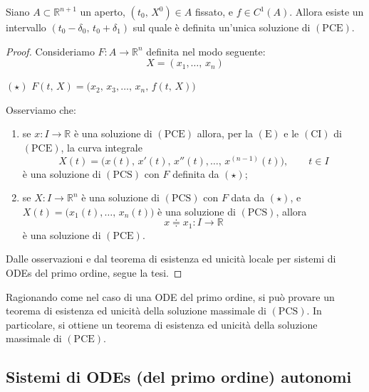 \begin{cor}
Siano $A \subset \mathbb{R}^{n+1}$ un aperto, $(t_0,\,X^0) \in A$ fissato, e $f \in C^1(A)$. Allora esiste un intervallo $(t_0-\delta_0,\,t_0+\delta_1)$ sul quale è definita un'unica soluzione di $\mathrm{(PCE)}$.
\end{cor}
\begin{proof}
Consideriamo $F : A \longrightarrow \mathbb{R}^n$ definita nel modo seguente:
$$
X = (x_1,\ldots,\,x_n)
$$
\begin{center}
$\mathrm{(\star)}$
\hfill
$\displaystyle
F(t,\,X) = \Big( x_2,\,x_3,\ldots,\,x_n,\,f(t,\,X) \Big)
$
\hfill \null \\
\end{center}
Osserviamo che:
\begin{enumerate}[labelindent=\parindent,leftmargin=*,label=\textnormal{(\roman*)},start=1]
\item se $x : I \longrightarrow \mathbb{R}$ è una soluzione di $\mathrm{(PCE)}$ allora, per la $\mathrm{(E)}$ e le $\mathrm{(CI)}$ di $\mathrm{(PCE)}$, la curva integrale
$$
X(t) = \Big( x(t),\,x'(t),\,x''(t),\ldots,\,x^{(n-1)}(t) \Big), \qquad t \in I
$$
è una soluzione di $\mathrm{(PCS)}$ con $F$ definita da $\mathrm{(\star)}$;
\item se $X : I \longrightarrow \mathbb{R}^n$ è una soluzione di $\mathrm{(PCS)}$ con $F$ data da $\mathrm{(\star)}$, e $X(t) = \Big( x_1(t),\ldots,\,x_n(t) \Big)$ è una soluzione di $\mathrm{(PCS)}$, allora
$$
x \doteqdot x_1 : I \longrightarrow \mathbb{R}
$$
è una soluzione di $\mathrm{(PCE)}$.
\end{enumerate}
Dalle osservazioni e dal teorema di esistenza ed unicità locale per sistemi di ODEs del primo ordine, segue la tesi.
\end{proof}

\begin{obs}
Ragionando come nel caso di una ODE del primo ordine, si può provare un teorema di esistenza ed unicità della soluzione massimale di $\mathrm{(PCS)}$. In particolare, si ottiene un teorema di esistenza ed unicità della soluzione massimale di $\mathrm{(PCE)}$.
\end{obs}




\subsection{Sistemi di ODEs (del primo ordine) autonomi}

